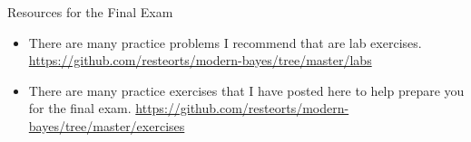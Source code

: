 \documentclass[ignorenonframetext,]{beamer}
\providecommand{\tightlist}{%
  \setlength{\itemsep}{0pt}\setlength{\parskip}{0pt}}
\begin{document}
\begin{frame}{Resources for the Final Exam}

\begin{itemize}
\tightlist
\item
  There are many practice problems I recommend that are lab exercises.
  \url{https://github.com/resteorts/modern-bayes/tree/master/labs}
\item
  There are many practice exercises that I have posted here to help
  prepare you for the final exam.
  \url{https://github.com/resteorts/modern-bayes/tree/master/exercises}
\end{itemize}

\end{frame}
\end{document}
